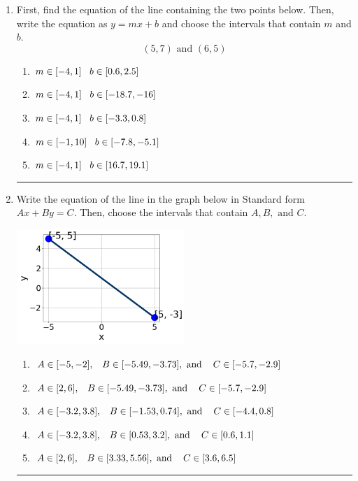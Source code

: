 \documentclass[14pt]{extbook}
\newcommand{\litem}[1]{\item#1\hspace*{-1cm}\rule{\textwidth}{0.4pt}}
\begin{document}
\begin{enumerate}
{\begin{enumerate}[label=\Alph*.]
\end{enumerate} }
\litem{
First, find the equation of the line containing the two points below. Then, write the equation as $ y=mx+b $ and choose the intervals that contain $m$ and $b$.\[ (5, 7) \text{ and } (6, 5) \]\begin{enumerate}[label=\Alph*.]
\item \( m \in [-4, 1] \hspace*{3mm} b \in [0.6, 2.5] \)
\item \( m \in [-4, 1] \hspace*{3mm} b \in [-18.7, -16] \)
\item \( m \in [-4, 1] \hspace*{3mm} b \in [-3.3, 0.8] \)
\item \( m \in [-1, 10] \hspace*{3mm} b \in [-7.8, -5.1] \)
\item \( m \in [-4, 1] \hspace*{3mm} b \in [16.7, 19.1] \)

\end{enumerate} }
\litem{
Write the equation of the line in the graph below in Standard form $Ax+By=C$. Then, choose the intervals that contain $A, B, \text{ and } C$.
\begin{center}
    \includegraphics[width=0.5\textwidth]{../Figures/linearGraphToStandardCopyB.png}
\end{center}
\begin{enumerate}[label=\Alph*.]
\item \( A \in [-5, -2], \hspace{3mm} B \in [-5.49, -3.73], \text{ and } \hspace{3mm} C \in [-5.7, -2.9] \)
\item \( A \in [2, 6], \hspace{3mm} B \in [-5.49, -3.73], \text{ and } \hspace{3mm} C \in [-5.7, -2.9] \)
\item \( A \in [-3.2, 3.8], \hspace{3mm} B \in [-1.53, 0.74], \text{ and } \hspace{3mm} C \in [-4.4, 0.8] \)
\item \( A \in [-3.2, 3.8], \hspace{3mm} B \in [0.53, 3.2], \text{ and } \hspace{3mm} C \in [0.6, 1.1] \)
\item \( A \in [2, 6], \hspace{3mm} B \in [3.33, 5.56], \text{ and } \hspace{3mm} C \in [3.6, 6.5] \)

\end{enumerate} }
\end{enumerate}
\end{document}

